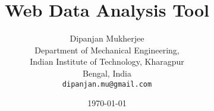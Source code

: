 \title{\Huge Web Data Analysis Tool\\[0.5in]}
\author{Dipanjan Mukherjee\\
    Department of Mechanical Engineering,\\
    Indian Institute of Technology, Kharagpur\\
    Bengal, India\\
    \texttt{dipanjan.mu@gmail.com}}
\date{\today}
\maketitle
